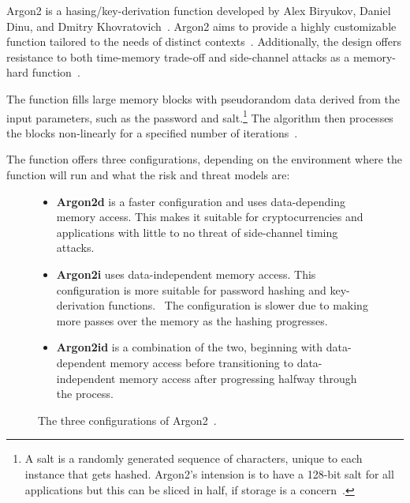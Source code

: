 Argon2 is a hasing/key-derivation function developed by Alex Biryukov, Daniel
Dinu, and Dmitry Khovratovich~\cite{argon2specs}.
Argon2 aims to provide a highly customizable function
tailored to the needs of distinct contexts~\cite{argon2specs}.
Additionally, the design offers resistance to both time-memory trade-off and
side-channel attacks as a memory-hard function~\cite{argon2specs}.

The function fills large memory blocks with pseudorandom data derived from the
input parameters, such as the password and salt.\footnote{
  A salt is a randomly generated sequence of characters, unique to each instance
  that gets hashed. Argon2's intension is to have a 128-bit salt for all
  applications but this can be sliced in half, if storage is a
  concern~\cite{argon2specs}.
}
The algorithm then processes the blocks non-linearly for a specified number of
iterations~\cite{argon2specs}.

The function offers three configurations, depending on the environment where the
function will run and what the risk and threat models are:

\begin{figure}[htbp]
  \centering
  \begin{itemize}
    \item \textbf{Argon2d} is a faster configuration and uses data-depending
    memory access.
    This makes it suitable for cryptocurrencies and applications with little to
    no threat of side-channel timing attacks.\protect\footnotemark
    \item \textbf{Argon2i} uses data-independent memory access.
    This configuration is more suitable for password hashing and key-derivation
    functions.\protect\footnotemark
    ~The configuration is slower due to making more passes over the memory as
    the hashing progresses.
    \item \textbf{Argon2id} is a combination of the two, beginning with
    data-dependent memory access before transitioning to data-independent
    memory access after progressing halfway through the process.
  \end{itemize}
  \caption{The three configurations of Argon2~\cite{argon2specs}.}
  \label{fig:argon2conf}
\end{figure}


